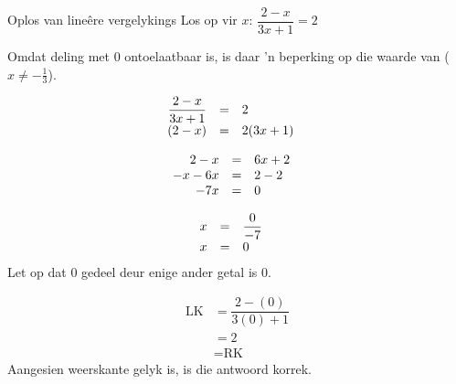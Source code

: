 \begin{wex}{Oplos van lineêre vergelykings}
{Los op vir $x$: $\dfrac{2-x}{3x+1}=2$} 
{
Omdat deling met $0$ ontoelaatbaar is, is daar ’n beperking op die waarde van ($x\neq -\frac{1}{3}$).

\begin{equation*}
    \begin{array}{ccll}\hfill \dfrac{2-x}{3x+1}& =& 2\hfill & \\
	\hfill (2-x)& =& 2(3x+1)\hfill & \\ 
    \end{array}
\end{equation*}

\begin{equation*}
    \begin{array}{ccll}
	\hfill 2-x& =& 6x+2\hfill & \hfill \\ 
	\hfill -x-6x& =& 2-2\hfill & \hfill \\ 
	\hfill -7x& =& 0\hfill & \hfill
    \end{array}
\end{equation*}

\begin{equation*}
    \begin{array}{ccll}

	\hfill x& =& \dfrac{0}{-7}\hfill & \\
	\hfill x& =& 0\hfill & \hfill 
    \end{array}
\end{equation*}
Let op dat $0$ gedeel deur enige ander getal is $0$.


\begin{equation*}
    \begin{array}{ccc}
  \mbox{LK} &=\dfrac{2-(0)}{3(0)+1} \\
	    &= 2 \\
	    &= \mbox{RK}
\end{array}
\end{equation*}
Aangesien weerskante gelyk is, is die antwoord korrek.
}
\end{wex}


